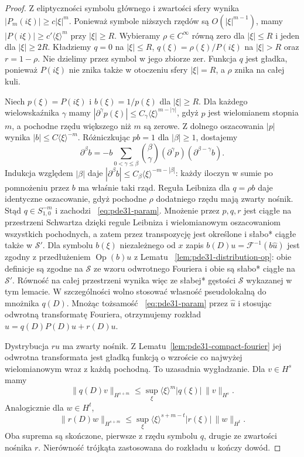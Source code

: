 \begin{proof}
Z eliptyczności symbolu głównego i zwartości sfery wynika
$|P_m(i\xi)|\ge c|\xi|^m$. Ponieważ symbole niższych
rzędów są $O(|\xi|^{m-1})$, mamy
$|P(i\xi)|\ge c'\langle\xi\rangle^m$ przy $|\xi|\ge R$.
Wybieramy $\rho\in C^\infty$ równą zero dla $|\xi|\le R$
i jeden dla $|\xi|\ge2R$. Kładziemy $q=0$ na $|\xi|\le R$,
$q(\xi)=\rho(\xi)/P(i\xi)$ na $|\xi|>R$
oraz $r=1-\rho$. Nie dzielimy przez symbol
w jego zbiorze zer. Funkcja $q$ jest gładka,
ponieważ $P(i\xi)$ nie znika także w otoczeniu
sfery $|\xi|=R$, a $\rho$ znika na całej kuli.

Niech $p(\xi)=P(i\xi)$ i $b(\xi)=1/p(\xi)$
dla $|\xi|\ge R$. Dla każdego wielowskaźnika
$\gamma$ mamy $|\partial^\gamma p(\xi)|
\le C_\gamma\langle\xi\rangle^{m-|\gamma|}$,
gdyż $p$ jest wielomianem stopnia $m$,
a pochodne rzędu większego niż $m$ są zerowe.
Z dolnego oszacowania $|p|$ wynika
$|b|\le C\langle\xi\rangle^{-m}$.
Różniczkując $pb=1$ dla $|\beta|\ge1$, dostajemy
\[
 \partial^\beta b=-b\sum_{0<\gamma\le\beta}
 \binom{\beta}{\gamma}(\partial^\gamma p)
 (\partial^{\beta-\gamma}b).
\]
Indukcja względem $|\beta|$ daje
$|\partial^\beta b|\le C_\beta
\langle\xi\rangle^{-m-|\beta|}$:
każdy iloczyn w sumie po pomnożeniu przez $b$
ma właśnie taki rząd. Reguła Leibniza dla $q=\rho b$
daje identyczne oszacowanie, gdyż pochodne $\rho$
dodatniego rzędu mają zwarty nośnik.
Stąd $q\in S^{-m}_{1,0}$ i zachodzi
~\eqref{eq:pde31-param}.
Mnożenie przez $p,q,r$ jest ciągłe na przestrzeni
Schwartza dzięki regule Leibniza i wielomianowym
oszacowaniom wszystkich pochodnych, a zatem przez
transpozycję jest określone i słabo* ciągłe
także w $\mathcal S'$.
Dla symbolu $b(\xi)$ niezależnego od $x$ zapis
$b(D)u=\mathcal F^{-1}(b\widehat u)$ jest zgodny
z przedłużeniem $\operatorname{Op}(b)u$ z Lematu
~\ref{lem:pde31-distribution-op}: obie definicje
są zgodne na $\mathcal S$ ze wzoru odwrotnego
Fouriera i obie są słabo* ciągłe na $\mathcal S'$.
Równość na całej przestrzeni wynika więc ze
słabej* gęstości $\mathcal S$ wykazanej w tym lemacie.
W szczególności wolno stosować własność
pseudolokalną do mnożnika $q(D)$.
Mnożąc tożsamość
~\eqref{eq:pde31-param} przez $\widehat u$
i stosując odwrotną transformatę Fouriera,
otrzymujemy rozkład $u=q(D)P(D)u+r(D)u$.

Dystrybucja $r\widehat u$ ma zwarty nośnik.
Z Lematu~\ref{lem:pde31-compact-fourier}
jej odwrotna transformata jest gładką funkcją
o wzroście co najwyżej wielomianowym wraz z
każdą pochodną. To uzasadnia wygładzanie.
Dla $v\in H^s$ mamy
\[
 \|q(D)v\|_{H^{s+m}}
 \le \sup_\xi\langle\xi\rangle^m|q(\xi)|\,\|v\|_{H^s}.
\]
Analogicznie dla $w\in H^t$,
\[
 \|r(D)w\|_{H^{s+m}}
 \le\sup_\xi\langle\xi\rangle^{s+m-t}|r(\xi)|\,\|w\|_{H^t}.
\]
Oba suprema są skończone, pierwsze z rzędu
symbolu $q$, drugie ze zwartości nośnika $r$.
Nierówność trójkąta zastosowana do rozkładu $u$
kończy dowód.
\end{proof}

